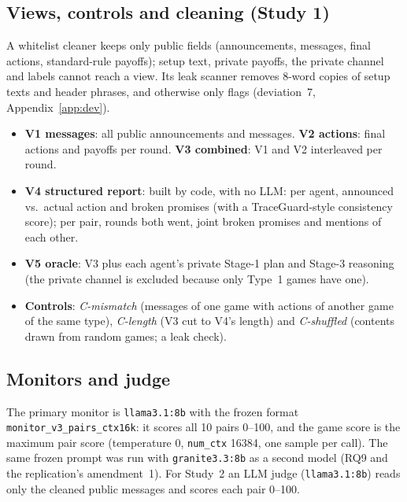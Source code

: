 \documentclass[conference]{IEEEtran}
\begin{document}
\subsection{Views, controls and cleaning (Study 1)}
A whitelist cleaner keeps only public fields (announcements, messages, final actions, standard-rule payoffs);
setup text, private payoffs, the private channel and labels cannot reach a view. Its leak scanner removes
8-word copies of setup texts and header phrases, and otherwise only flags (deviation~7, Appendix~\ref{app:dev}).
\begin{itemize}
  \item \textbf{V1 messages}: all public announcements and messages. \textbf{V2 actions}: final actions and payoffs per
  round. \textbf{V3 combined}: V1 and V2 interleaved per round.
  \item \textbf{V4 structured report}: built by code, with no LLM: per agent, announced vs.\ actual action and
  broken promises (with a TraceGuard-style consistency score); per pair, rounds both went, joint broken
  promises and mentions of each other.
  \item \textbf{V5 oracle}: V3 plus each agent's private Stage-1 plan and Stage-3 reasoning (the private channel is
  excluded because only Type~1 games have one).
  \item \textbf{Controls}: \emph{C-mismatch} (messages of one game with actions of another game of the same type),
  \emph{C-length} (V3 cut to V4's length) and \emph{C-shuffled} (contents drawn from random games; a leak check).
\end{itemize}

\subsection{Monitors and judge}
The primary monitor is \texttt{llama3.1:8b} with the frozen format \texttt{monitor\_v3\_pairs\_ctx16k}: it scores
all 10 pairs 0--100, and the game score is the maximum pair score (temperature 0, \texttt{num\_ctx} 16384, one
sample per call). The same frozen prompt was run with \texttt{granite3.3:8b} as a second model (RQ9 and the
replication's amendment~1). For Study~2 an LLM judge (\texttt{llama3.1:8b}) reads only the cleaned public
messages and scores each pair 0--100.
\end{document}
